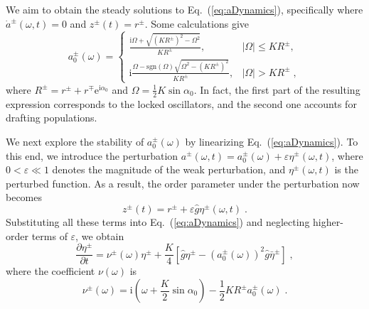 \documentclass{article}
\begin{document}
We aim to obtain the steady solutions to Eq.~(\ref{eq:aDynamics}), specifically where $\dot{a}^{\pm}\left(\omega, t\right)=0$ and $z^{\pm}\left(t\right)=r^{\pm}$. 
Some calculations give
\begin{equation}
    a_{0}^{\pm}\left( \omega \right) =\begin{cases}
        \frac{\mathrm{i}\Omega +\sqrt{\left( KR^{\pm} \right) ^2-\Omega ^2}}{KR^{\pm}},&		\left| \Omega \right|\leqslant KR^{\pm},\;\\
        \mathrm{i}\frac{\Omega -\text{sgn} \left( \Omega \right) \sqrt{\Omega ^2-\left( KR^{\pm} \right) ^2}}{KR^{\pm}},&		\left| \Omega \right|>KR^{\pm}\;,
    \end{cases}
\end{equation}
where $R^{\pm}=r^{\pm}+r^{\mp}\mathrm{e}^{\mathrm{i}\alpha_0}$ and $\Omega=\frac{1}{2}K\sin\alpha_0$.  
In fact, the first part of the resulting expression corresponds to the locked oscillators, and the second one accounts for drafting populations.

We next explore the stability of $a_{0}^{\pm}\left( \omega \right)$ by linearizing Eq.~(\ref{eq:aDynamics}).
To this end, we introduce the perturbation $a^{\pm}\left( \omega ,t \right) =a_{0}^{\pm}\left( \omega \right) +\varepsilon \eta^{\pm} \left( \omega ,t \right)$, where $0 < \varepsilon \ll 1$ denotes the magnitude of the weak perturbation, and $\eta^{\pm} \left( \omega ,t \right)$ is the perturbed function.
As a result, the order parameter under the perturbation now becomes
\begin{equation}
    z^{\pm}\left( t \right) =r^{\pm}+\varepsilon \hat{g}\eta^{\pm} \left( \omega ,t \right)\;.
\end{equation}
Substituting all these terms into Eq.~(\ref{eq:aDynamics}) and neglecting higher-order terms of $\varepsilon$, we obtain
\begin{equation}
    \label{eq:etaDynamics}
    \frac{\partial \eta ^{\pm}}{\partial t}=\nu^{\pm} \left( \omega \right) \eta ^{\pm}+\frac{K}{4}\left[ \hat{g}\eta^{\pm} -\left( a_{0}^{\pm}\left( \omega \right) \right) ^2\hat{g}\bar{\eta}^{\pm} \right] \;,
\end{equation}
where the coefficient $\nu \left( \omega \right)$ is
\begin{equation}
    \nu ^{\pm}\left( \omega \right) =\text{i}\left( \omega +\frac{K}{2}\sin \alpha _0 \right) -\frac{1}{2}KR^{\pm}a_{0}^{\pm}\left( \omega \right) \;.
\end{equation}
\end{document}
